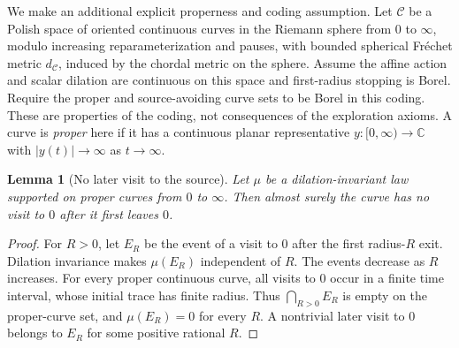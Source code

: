 \documentclass[11pt]{article}
\newtheorem{lemma}[theorem]{Lemma}
\theoremstyle{definition}\newtheorem{definition}[theorem]{Definition}
\theoremstyle{remark}\newtheorem{remark}[theorem]{Remark}
\begin{document}
We make an additional explicit properness and coding assumption.
Let $\mathcal C$ be a Polish space of oriented continuous curves in the
Riemann sphere from $0$ to $\infty$, modulo increasing reparameterization
and pauses, with bounded spherical Fr\'echet metric $d_{\mathcal C}$,
induced by the chordal metric on the sphere.
Assume the affine action and scalar dilation are continuous on this
space and first-radius stopping is Borel.  Require the proper and
source-avoiding curve sets to be Borel in this coding.  These are properties of the
coding, not consequences of the exploration axioms.  A curve is
\emph{proper} here if it has a continuous planar representative
$y:[0,\infty)\to\mathbb C$ with $|y(t)|\to\infty$ as $t\to\infty$.

\begin{lemma}[No later visit to the source]
\label{lem:wp-no-source-return}
Let $\mu$ be a dilation-invariant law supported on proper curves from
$0$ to $\infty$.  Then almost surely the curve has no visit to $0$
after it first leaves $0$.
\end{lemma}
\begin{proof}
For $R>0$, let $E_R$ be the event of a visit to $0$ after the first
radius-$R$ exit.  Dilation invariance makes $\mu(E_R)$ independent of
$R$.  The events decrease as $R$ increases.  For every proper continuous
curve, all visits to $0$ occur in a finite time interval, whose initial
trace has finite radius.  Thus $\bigcap_{R>0}E_R$ is empty on the
proper-curve set, and $\mu(E_R)=0$ for every $R$.  A nontrivial later
visit to $0$ belongs to $E_R$ for some positive rational $R$.
\end{proof}
\end{document}
